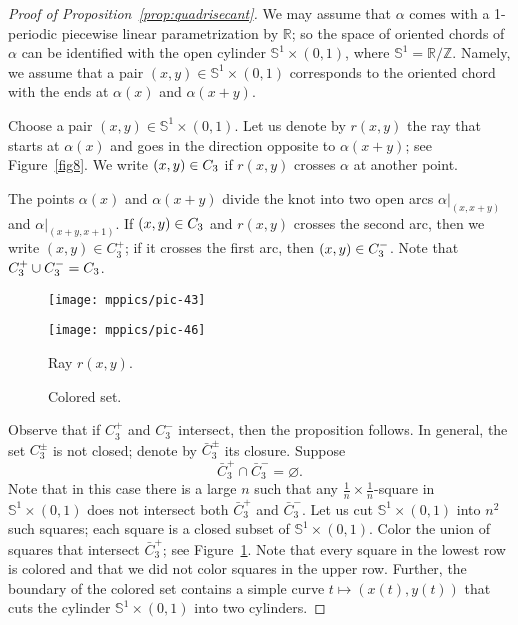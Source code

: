 \documentclass{article}
\newcommand*{\arXiv}[2]{#1} %
\newcommand*{\z}[1]{#1\nobreak\discretionary{}%
            {\hbox{$\mathsurround=0pt #1$}}{}}
\theoremstyle{theorem}
\newtheorem{Crofton-type formula}[theorem]{Crofton-type formula}
\newtheorem{Douglas--Rado theorem}[theorem]{\arXiv{Douglas--Rado theorem}{Theorem}}
\newtheorem{Extended monotonicity theorem}[theorem]{\arXiv{Extended monotonicity theorem}{Theorem}}
\theoremstyle{definition}
\def\RR{\mathbb{R}}
\def\ZZ{\mathbb{Z}}
\def\emptyset{\varnothing}
\begin{document}
\begin{proof}[Proof of Proposition~\ref{prop:quadrisecant}]
We may assume that $\alpha$ comes with a 1-periodic piecewise linear parametrization by $\RR$;
so the space of oriented chords of $\alpha$ can be identified with the open cylinder $\mathbb{S}^1\times (0,1)$, where $\mathbb{S}^1=\RR/\ZZ$.
Namely, we assume that a pair $(x,y)\in \mathbb{S}^1\times (0,1)$ corresponds to the oriented chord with the ends at $\alpha(x)$ and $\alpha(x+y)$.

Choose a pair $(x,y)\in \mathbb{S}^1\times (0,1)$.
Let us denote by $r(x,y)$ the ray that starts at $\alpha(x)$ and goes in the direction opposite to $\alpha(x+y)$; see Figure~\ref{fig8}.
We write $(x,y)\z\in C_3$ if $r(x,y)$ crosses $\alpha$ at another point.

The points $\alpha(x)$ and $\alpha(x+y)$ divide the knot into two open arcs $\alpha|_{(x,x+y)}$ and $\alpha|_{(x+y,x+1)}$.
If $(x,y)\z\in C_3$ and $r(x,y)$ crosses the second arc, then we write $(x,y)\in C_3^+$;
if it crosses the first arc, then $(x,y)\z\in C_3^-$.
Note that $C_3^+\cup C_3^-\z=C_3$.

\begin{figure}[!ht]
\begin{minipage}{.48\textwidth}
\centering
\arXiv{\texttt{[image: mppics/pic-43]}}{\texttt{[image: pic-43]}}
\end{minipage}\hfill
\begin{minipage}{.48\textwidth}
\centering
\arXiv{\texttt{[image: mppics/pic-46]}}{\texttt{[image: pic-46]}}
\end{minipage}

\medskip

\begin{minipage}{.48\textwidth}
\centering
\caption{Ray $r(x,y)$.}
\label{fig8}
\end{minipage}\hfill
\begin{minipage}{.48\textwidth}
\centering
\caption{Colored set.}
\label{fig9}
\end{minipage}
\vskip-0mm
\end{figure}

Observe that if $C_3^+$ and $C_3^-$ intersect, then the proposition follows.
In general, the set $C_3^\pm$ is not closed;
denote by $\bar C_3^\pm$ its closure.
Suppose 
\[\bar C_3^+\cap \bar C_3^-=\emptyset.\]
Note that in this case there is a large $n$ such that any $\tfrac1n\times\tfrac1n$-square in $\mathbb{S}^1\times (0,1)$ does not intersect both $\bar C_3^+$ and $\bar C_3^-$.
Let us cut $\mathbb{S}^1\times (0,1)$ into $n^2$ such squares; each square is a closed subset of $\mathbb{S}^1\times (0,1)$.
Color the union of squares that intersect $\bar C_3^+$; see Figure~\ref{fig9}.
Note that every square in the lowest row is colored and that we did not color squares in the upper row.
Further, the boundary of the colored set contains a simple curve $t\mapsto(x(t),y(t))$ that cuts  the cylinder $\mathbb{S}^1\times (0,1)$ into two cylinders.


\end{proof}
\end{document}
